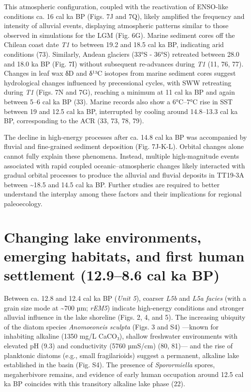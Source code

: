 \documentclass[
]{article}
\begin{document}
This atmospheric configuration, coupled with the reactivation of
ENSO-like conditions ca. 16 cal ka BP (Figs. 7J and 7Q), likely
amplified the frequency and intensity of alluvial events, displaying
atmospheric patterns similar to those observed in simulations for the
LGM (Fig. 6G). Marine sediment cores off the Chilean coast date
\emph{T1} to between 19.2 and 18.5 cal ka BP, indicating arid conditions
(73). Similarly, Andean glaciers (33°S - 36°S) retreated between 28.0
and 18.0 ka BP (Fig. 7I) without subsequent re-advances during \emph{T1}
(11, 76, 77). Changes in leaf wax δD and δ¹³C isotopes from marine
sediment cores suggest hydrological changes influenced by precessional
cycles, with SWW retreating during \emph{T1} (Figs. 7N and 7G), reaching
a minimum at 11 cal ka BP and again between 5--6 cal ka BP (33). Marine
records also show a 6°C--7°C rise in SST between 19 and 12.5 cal ka BP,
interrupted by cooling around 14.8--13.3 cal ka BP, corresponding to the
ACR (33, 73, 78, 79).

The decline in high-energy processes after ca. 14.8 cal ka BP was
accompanied by fluvial and fine-grained sediment deposition (Fig.
7J-K-L). Orbital changes alone cannot fully explain these phenomena.
Instead, multiple high-magnitude events associated with rapid coupled
oceanic--atmospheric changes likely interacted with gradual orbital
processes to produce the alluvial and fluvial deposits in TT19-3A
between \textasciitilde18.5 and 14.5 cal ka BP. Further studies are
required to better understand the interplay among these factors and
their implications for regional paleoecology.

\section{Changing lake environments, emerging habitats, and first human
settlement (12.9--8.6 cal ka
BP)}\label{changing-lake-environments-emerging-habitats-and-first-human-settlement-12.98.6-cal-ka-bp}

Between ca. 12.8 and 12.4 cal ka BP (\emph{Unit 5}), coarser \emph{L5b}
and \emph{L5a facies} (with a grain size mode at \textasciitilde700 µm;
\emph{rEM5}) indicate high-energy conditions and stronger alluvial
influence in the lake shoreline (Figs. 2, 4, and 5). The increasing
ubiquity of the diatom species \emph{Anomoeoneis sculpta} (Figs. 3 and
S4) ---known for inhabiting alkaline (1350 mg/L CaCO₃), shallow
freshwater environments with elevated pH (9.3) and conductivity (5760
µmS/cm) (80, 81)--- and the rise of planktonic diatoms (e.g., small
fragilarioids) suggest a permanent, alkaline lake established in the
basin (Fig. S4). The presence of \emph{Sporormiella} spores,
megaherbivore remains, and evidence of early human occupation around
12.5 cal ka BP coincides with this transitory alkaline lake phase (22).
\end{document}
